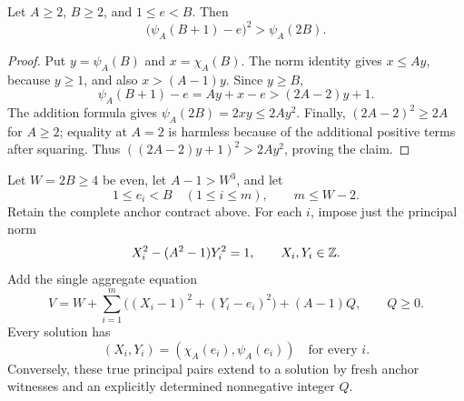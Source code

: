 \begin{lemma}\label{lem:next-index-square}
Let $A\ge2$, $B\ge2$, and $1\le e<B$.  Then
\[
 \bigl(\psi_A(B+1)-e\bigr)^2>\psi_A(2B).
\]
\end{lemma}
\begin{proof}
Put $y=\psi_A(B)$ and $x=\chi_A(B)$.  The norm identity gives
$x\le Ay$, because $y\ge1$, and also $x>(A-1)y$.  Since $y\ge B$,
\[
 \psi_A(B+1)-e=Ay+x-e>(2A-2)y+1.
\]
The addition formula gives $\psi_A(2B)=2xy\le2Ay^2$.  Finally,
$(2A-2)^2\ge2A$ for $A\ge2$; equality at $A=2$ is harmless because
of the additional positive terms after squaring.  Thus
$((2A-2)y+1)^2>2Ay^2$, proving the claim.
\end{proof}

\begin{theorem}
\label{thm:one-row-oriented}
Let $W=2B\ge4$ be even, let $A-1>W^3$, and let
\[
 1\le e_i<B\quad(1\le i\le m),\qquad m\le W-2.
\]
Retain the complete anchor contract above.  For each $i$, impose just
the principal norm
\begin{equation}\label{eq:one-row-principal}
 X_i^2-(A^2-1)Y_i^2=1,
 \qquad X_i,Y_i\in\mathbb Z.
\end{equation}
Add the single aggregate equation
\begin{equation}\label{eq:one-row-oriented}
 \boxed{\quad
 V=W+\sum_{i=1}^m\bigl((X_i-1)^2+(Y_i-e_i)^2\bigr)
          +(A-1)Q,\qquad Q\ge0.
 \quad}
\end{equation}
Every solution has
\[
 (X_i,Y_i)=(\chi_A(e_i),\psi_A(e_i))
 \quad\text{for every }i.
\]
Conversely, these true principal pairs extend to a solution by fresh
anchor witnesses and an explicitly determined nonnegative integer $Q$.
\end{theorem}

